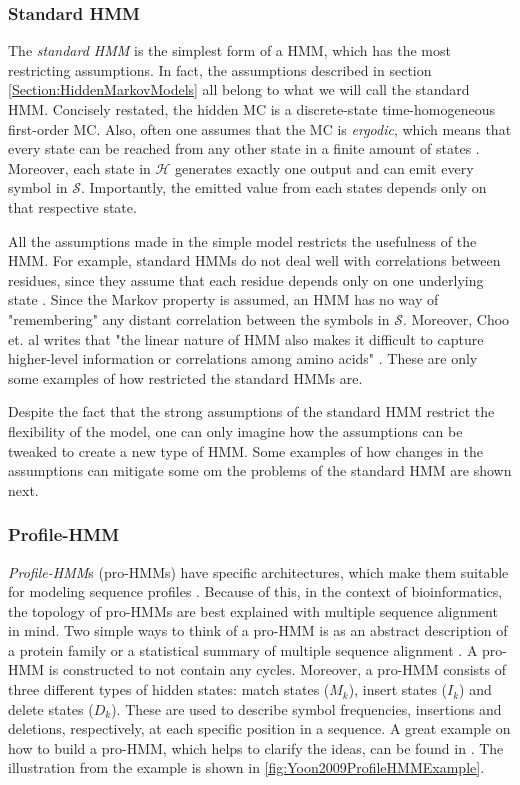 \documentclass{article}\usepackage[]{graphicx}\usepackage[]{color}
\begin{document}
\subsubsection{Standard HMM}\label{Section:StandardHMM}
The \textit{standard HMM} is the simplest form of a HMM, which has the most restricting assumptions. In fact, the assumptions described in section \ref{Section:HiddenMarkovModels} all belong to what we will call the standard HMM. Concisely restated, the hidden MC is a discrete-state time-homogeneous first-order MC. Also, often one assumes that the MC is \textit{ergodic}, which means that every state can be reached from any other state in a finite amount of states \cite{Rabiner1989}. Moreover, each state in $\mathcal{H}$ generates exactly one output and can emit every symbol in $\mathcal{S}$. Importantly, the emitted value from each states depends only on that respective state. 

All the assumptions made in the simple model restricts the usefulness of the HMM. For example, standard HMMs do not deal well with correlations between residues, since they assume that each residue depends only on one underlying state \cite{Eddy04}. Since the Markov property is assumed, an HMM has no way of "remembering" any distant correlation between the symbols in $\mathcal{S}$. Moreover, Choo et. al writes that "the linear nature of HMM also makes it difficult to capture higher-level information or correlations among amino acids" \cite{Choo2004}. These are only some examples of how restricted the standard HMMs are. 

Despite the fact that the strong assumptions of the standard HMM restrict the flexibility of the model, one can only imagine how the assumptions can be tweaked to create a new type of HMM. Some examples of how changes in the assumptions can mitigate some om the problems of the standard HMM are shown next.  

\subsubsection{Profile-HMM}\label{Section:Profile-HMM}
\textit{Profile-HMM}s (pro-HMMs) have specific architectures, which make them suitable for modeling sequence profiles \cite{Yoon2009}. Because of this, in the context of bioinformatics, the topology of pro-HMMs are best explained with multiple sequence alignment in mind. Two simple ways to think of a pro-HMM is as an abstract description of a protein family or a statistical summary of multiple sequence alignment \cite{Christianini2006}. A pro-HMM is constructed to not contain any cycles. Moreover, a pro-HMM consists of three different types of hidden states: match states ($M_k$), insert states ($I_k$) and delete states ($D_k$). These are used to describe symbol frequencies, insertions and deletions, respectively, at each specific position in a sequence. A great example on how to build a pro-HMM, which helps to clarify the ideas, can be found in \cite{Yoon2009}. The illustration from the example is shown in \ref{fig:Yoon2009ProfileHMMExample}.
\end{document}
